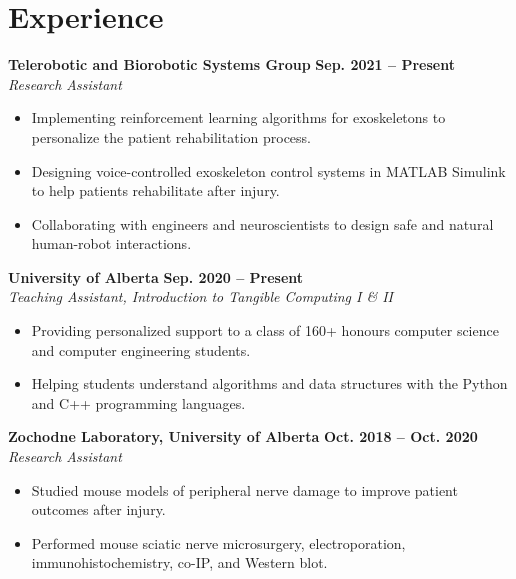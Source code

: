 \documentclass{article}
\begin{document}
\section*{\textcolor{my_colour}{Experience}}
\vspace{-.25em} \hrulefill \vspace{.25em}

\textbf{Telerobotic and Biorobotic Systems Group} \hfill \textbf{Sep. 2021 -- Present}\\
\textit{Research Assistant}
\begin{itemize}
    \item Implementing reinforcement learning algorithms for exoskeletons to personalize the patient rehabilitation process.
    \item Designing voice-controlled exoskeleton control systems in MATLAB Simulink to help patients rehabilitate after injury.
    \item Collaborating with engineers and neuroscientists to design safe and natural human-robot interactions.
\end{itemize} \vspace{1em}

\textbf{University of Alberta} \hfill \textbf{Sep. 2020 -- Present}\\
\textit{Teaching Assistant, Introduction to Tangible Computing I \& II}
\begin{itemize}
    \item Providing personalized support to a class of 160+ honours computer science and computer engineering students.
    \item Helping students understand algorithms and data structures with the Python and C++ programming languages.
\end{itemize} \vspace{1em}

\textbf{Zochodne Laboratory, University of Alberta} \hfill \textbf{Oct. 2018 -- Oct. 2020}\\
\textit{Research Assistant}
\begin{itemize}
    \item Studied mouse models of peripheral nerve damage to improve patient outcomes after injury.
    \item Performed mouse sciatic nerve microsurgery, electroporation, immunohistochemistry, co-IP, and Western blot.
\end{itemize}
\end{document}
